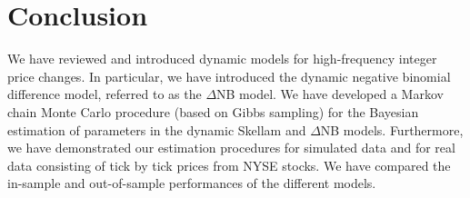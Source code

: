 \documentclass[12pt]{article}
\begin{document}
\section{Conclusion}\label{c_sec:concl}

We have reviewed and introduced dynamic models for high-frequency integer price changes.
In particular, we have introduced
the dynamic negative binomial difference model, referred to as the $\Delta$NB model.
We have developed a Markov chain Monte Carlo procedure (based on Gibbs sampling)
for the Bayesian estimation of parameters in the dynamic Skellam and $\Delta$NB models.
Furthermore, we have demonstrated our estimation procedures for simulated data and
for real data consisting of tick by tick prices from NYSE stocks.
We have compared the in-sample and out-of-sample
performances of the different models.
 



\newpage
\renewcommand{\theequation}{A\arabic{equation}}
\setcounter{equation}{0}
\appendix

\end{document}
